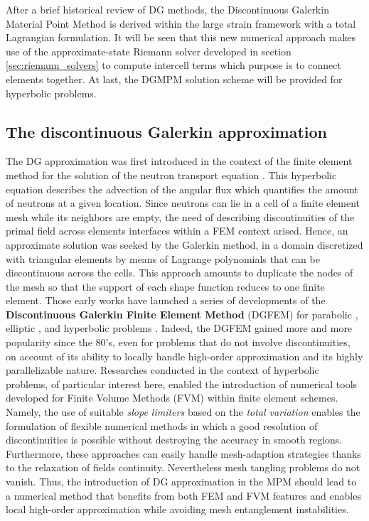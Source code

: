 After a brief historical review of DG methods, the Discontinuous Galerkin Material Point Method is derived within the large strain framework with a total Lagrangian formulation. It will be seen that this new numerical approach makes use of the approximate-state Riemann solver developed in section \ref{sec:riemann_solvers} to compute intercell terms which purpose is to connect elements together. At last, the DGMPM solution scheme will be provided for hyperbolic problems.

\subsection{The discontinuous Galerkin approximation}
The DG approximation was first introduced in the context of the finite element method for the solution of the neutron transport equation \cite{NeutronDG}. This hyperbolic equation describes the advection of the angular flux which quantifies the amount of neutrons at a given location. Since neutrons can lie in a cell of a finite element mesh while its neighbors are empty, the need of describing discontinuities of the primal field across elements interfaces within a FEM context arised. Hence, an approximate solution was seeked by the Galerkin method, in a domain discretized with triangular elements by means of Lagrange polynomials that can be discontinuous across the cells. This approach amounts to duplicate the nodes of the mesh so that the support of each shape function reduces to one finite element. Those early works have launched a series of developments of the \textbf{Discontinuous Galerkin Finite Element Method} (DGFEM) for parabolic \cite{Arnold_IPM}, elliptic \cite{Hansbo_DGsolid,Noel_HEDG}, and hyperbolic problems \cite{Cockburn}. Indeed, the DGFEM gained more and more popularity since the 80's, even for problems that do not involve discontinuities, on account of its ability to locally handle high-order approximation and its highly parallelizable nature. 
Researches conducted in the context of hyperbolic problems, of particular interest here, enabled the introduction of numerical tools developed for Finite Volume Methods (FVM) within finite element schemes.
Namely, the use of suitable \textit{slope limiters} \cite{vanLeer_Limiters} based on the \textit{total variation} \cite{Harten_TVD} enables the formulation of flexible numerical methods in which a good resolution of discontinuities is possible without destroying the accuracy in smooth regions. Furthermore, these approaches can easily handle mesh-adaption strategies thanks to the relaxation of fields continuity. Nevertheless mesh tangling problems do not vanish.
Thus, the introduction of DG approximation in the MPM should lead to a numerical method that benefits from both FEM and FVM features and enables local high-order approximation while avoiding mesh entanglement instabilities.


